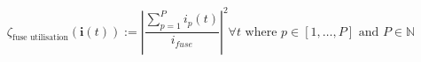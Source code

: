 \begin{equation}
	\zeta_\text{fuse utilisation}(\textbf{i}(t)) :=%
	\left|\frac{\sum_{p=1}^{P}{i_p(t)}}{i_{fuse}}\right|^2 \forall t%
	\text{ where } p \in [1, \dots, P]%
	\text{ and } P \in \mathbb{N}
	\label{ch1:equ:fuse-utilisation}
\end{equation}